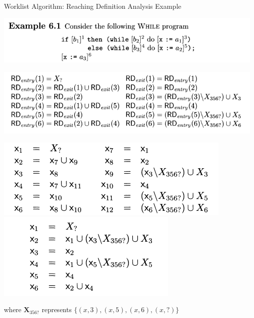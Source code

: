 \documentclass[aspectratio=1610, 13pt]{beamer}
\begin{document}
\begin{frame}{Worklist Algorithm: Reaching Definition Analysis Example}

\begin{center}
\includegraphics[scale=0.4]{rdexp.png}

\includegraphics[scale=0.4]{rdexp1.png}
\end{center}

\begin{center}
\includegraphics[scale=0.4]{rdexp2.png}
\includegraphics[scale=0.4]{rdexp3.png}
\end{center}

where $\mathbf{X}_{356?}$ represents $\{(x, 3), (x, 5), (x, 6), (x, ?)\}$

\end{frame}
\end{document}
